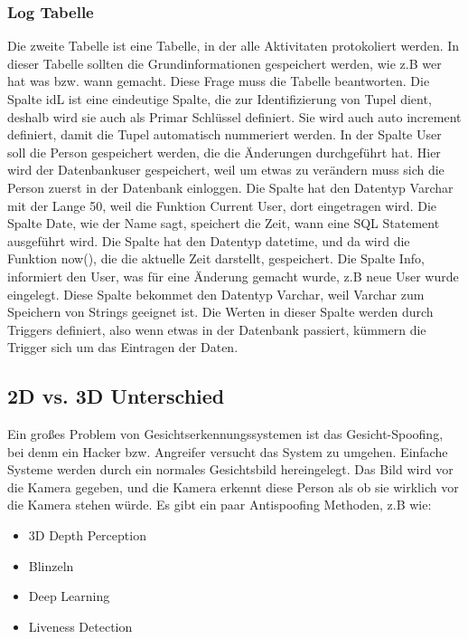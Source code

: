 \subsubsection{Log Tabelle}
Die zweite Tabelle ist eine Tabelle, in der alle Aktivitaten protokoliert werden. In dieser Tabelle sollten die Grundinformationen gespeichert werden, wie z.B wer hat was bzw. wann gemacht. Diese Frage muss die Tabelle beantworten.
\bigbreak
Die Spalte idL ist eine eindeutige Spalte, die zur Identifizierung von Tupel dient, deshalb wird sie auch als Primar Schlüssel definiert. Sie wird auch auto increment definiert, damit die Tupel automatisch nummeriert werden.
\bigbreak
In der Spalte User soll die Person gespeichert werden, die die Änderungen durchgeführt hat. Hier wird der Datenbankuser gespeichert, weil um etwas zu verändern muss sich die Person zuerst in der Datenbank einloggen. Die Spalte hat den Datentyp Varchar mit der Lange 50, weil die Funktion Current User, dort eingetragen wird.
\bigbreak
Die Spalte Date, wie der Name sagt, speichert die Zeit, wann eine SQL Statement ausgeführt wird. Die Spalte hat den Datentyp datetime, und da wird die Funktion now(), die die aktuelle Zeit darstellt, gespeichert.
\bigbreak
Die Spalte Info, informiert den User, was für eine Änderung gemacht wurde, z.B neue User wurde eingelegt. Diese Spalte bekommet den Datentyp Varchar, weil Varchar zum Speichern von Strings geeignet ist. Die Werten in dieser Spalte werden durch Triggers definiert, also wenn etwas in der Datenbank passiert, kümmern die Trigger sich um das Eintragen der Daten.

\subsection{2D vs. 3D Unterschied}
Ein großes Problem von Gesichtserkennungssystemen ist das Gesicht-Spoofing, bei denm ein Hacker bzw. Angreifer versucht das System zu umgehen. Einfache Systeme werden durch ein normales Gesichtsbild hereingelegt. Das Bild wird vor die Kamera gegeben, und die Kamera erkennt diese Person als ob sie wirklich vor die Kamera stehen würde. Es gibt ein paar Antispoofing Methoden, z.B wie:
\begin{itemize}
    \item 3D Depth Perception
    \item Blinzeln
    \item Deep Learning
    \item Liveness Detection
\end{itemize}
